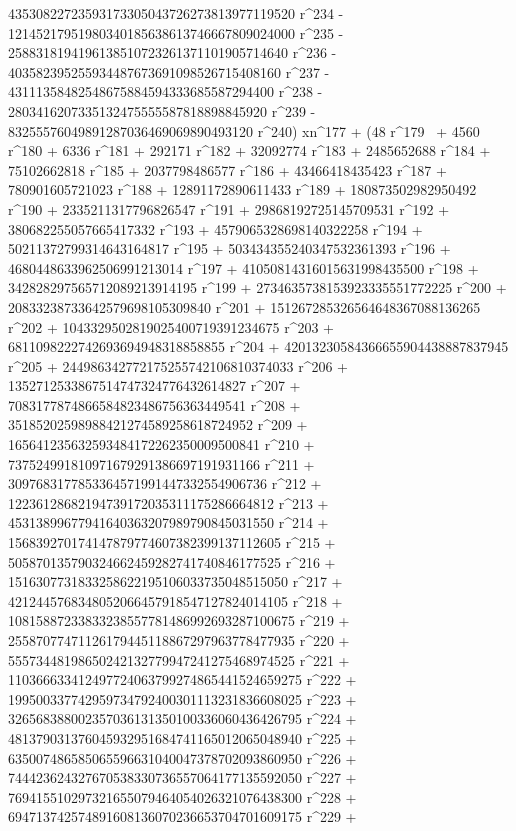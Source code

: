        43530822723593173305043726273813977119520 r^234 - 
       12145217951980340185638613746667809024000 r^235 - 
       2588318194196138510723261371101905714640 r^236 - 
       403582395255934487673691098526715408160 r^237 - 
       43111358482548675884594333685587294400 r^238 - 
       2803416207335132475555587818898845920 r^239 - 
       83255576049891287036469069890493120 r^240) xn^177 + (48 r^179 \
+ 4560 r^180 + 6336 r^181 + 292171 r^182 + 32092774 r^183 + 
       2485652688 r^184 + 75102662818 r^185 + 2037798486577 r^186 + 
       43466418435423 r^187 + 780901605721023 r^188 + 
       12891172890611433 r^189 + 180873502982950492 r^190 + 
       2335211317796826547 r^191 + 29868192725145709531 r^192 + 
       380682255057665417332 r^193 + 4579065328698140322258 r^194 + 
       50211372799314643164817 r^195 + 
       503434355240347532361393 r^196 + 
       4680448633962506991213014 r^197 + 
       41050814316015631998435500 r^198 + 
       342828297565712089213914195 r^199 + 
       2734635738153923335551772225 r^200 + 
       20833238733642579698105309840 r^201 + 
       151267285326564648367088136265 r^202 + 
       1043329502819025400719391234675 r^203 + 
       6811098222742693694948318858855 r^204 + 
       42013230584366655904438887837945 r^205 + 
       244986342772175255742106810374033 r^206 + 
       1352712533867514747324776432614827 r^207 + 
       7083177874866584823486756363449541 r^208 + 
       35185202598988421274589258618724952 r^209 + 
       165641235632593484172262350009500841 r^210 + 
       737524991810971679291386697191931166 r^211 + 
       3097683177853364571991447332554906736 r^212 + 
       12236128682194739172035311175286664812 r^213 + 
       45313899677941640363207989790845031550 r^214 + 
       156839270174147879774607382399137112605 r^215 + 
       505870135790324662459282741740846177525 r^216 + 
       1516307731833258622195106033735048515050 r^217 + 
       4212445768348052066457918547127824014105 r^218 + 
       10815887233833238557781486992693287100675 r^219 + 
       25587077471126179445118867297963778477935 r^220 + 
       55573448198650242132779947241275468974525 r^221 + 
       110366633412497724063799274865441524659275 r^222 + 
       199500337742959734792400301113231836608025 r^223 + 
       326568388002357036131350100336060436426795 r^224 + 
       481379031376045932951684741165012065048940 r^225 + 
       635007486585065596631040047378702093860950 r^226 + 
       744423624327670538330736557064177135592050 r^227 + 
       769415510297321655079464054026321076438300 r^228 + 
       694713742574891608136070236653704701609175 r^229 + 
